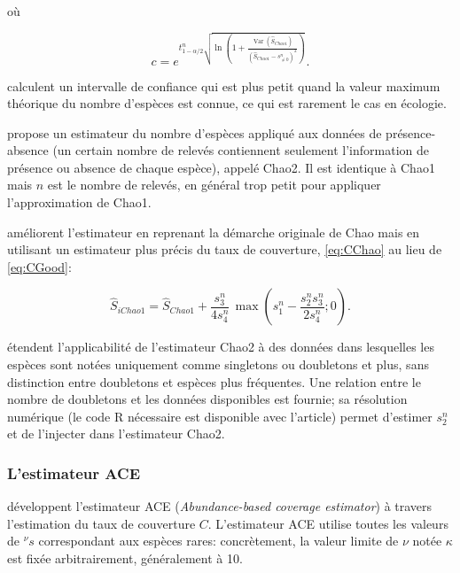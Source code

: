\documentclass[
  11pt,
  french,
  a4paper,
  extrafontsizes,onecolumn,openright
  ]{memoir}
\begin{document}
où

\begin{equation}
  \label{eq:ICChao1c}
  c=e^{t^{n}_{1-{\alpha}/{2}}\sqrt{\ln\left(1+\frac{\operatorname{Var}\left({\hat{S}}_\mathit{Chao1}\right)}{{\left({\hat{S}}_\mathit{Chao1}-{s^{n}_{\ne 0}}\right)}^2}\right)}}.
\end{equation}

\textcite[eq. 8]{Eren2012} calculent un intervalle de confiance qui est plus petit quand la valeur maximum théorique du nombre d'espèces est connue, ce qui est rarement le cas en écologie.

\textcite{Chao1987} propose un estimateur du nombre d'espèces appliqué aux données de présence-absence (un certain nombre de relevés contiennent seulement l'information de présence ou absence de chaque espèce), appelé Chao2. Il est identique à Chao1 mais \(n\) est le nombre de relevés, en général trop petit pour appliquer l'approximation de Chao1.

\textcite{Chiu2014a} améliorent l'estimateur en reprenant la démarche originale de Chao mais en utilisant un estimateur plus précis du taux de couverture, \eqref{eq:CChao} au lieu de \eqref{eq:CGood}:

\begin{equation}
  \label{eq:iChao1}
  {\hat{S}}_\mathit{iChao1} 
  = {\hat{S}}_\mathit{Chao1} 
  + \frac{s^{n}_{3}}{4s^{n}_{4}}\,
  \max\left(s^{n}_{1}-\frac{s^{n}_{2}s^{n}_{3}}{2s^{n}_{4}};0\right).
\end{equation}

\textcite{Chao2017} étendent l'applicabilité de l'estimateur Chao2 à des données dans lesquelles les espèces sont notées uniquement comme singletons ou doubletons et plus, sans distinction entre doubletons et espèces plus fréquentes.
Une relation entre le nombre de doubletons et les données disponibles est fournie; sa résolution numérique (le code R nécessaire est disponible avec l'article) permet d'estimer \(s^{n}_{2}\) et de l'injecter dans l'estimateur Chao2.

\hypertarget{lestimateur-ace}{%
\subsubsection{L'estimateur ACE}\label{lestimateur-ace}}

\textcite{Chao1992} développent l'estimateur ACE (\emph{Abundance-based coverage estimator}) à travers l'estimation du taux de couverture \(C\).
L'estimateur ACE utilise toutes les valeurs de \(^{\nu }s\) correspondant aux espèces rares: concrètement, la valeur limite de \(\nu\) notée \(\kappa\) est fixée arbitrairement, généralement à 10.
\end{document}
